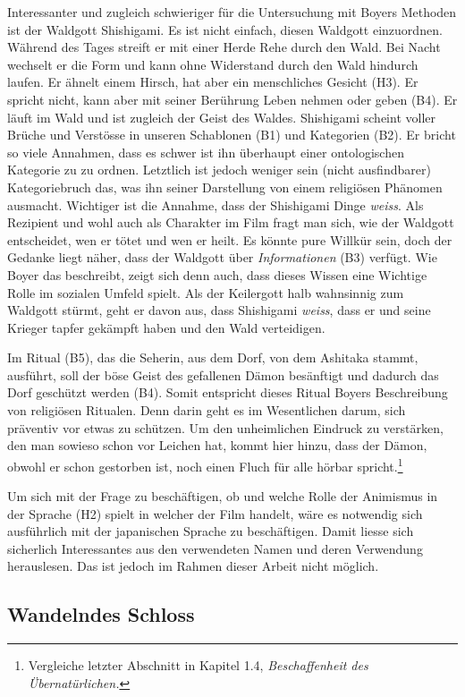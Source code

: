 Interessanter und zugleich schwieriger für die Untersuchung mit Boyers Methoden ist der Waldgott Shishigami. Es ist nicht einfach, diesen Waldgott einzuordnen. Während des Tages streift er mit einer Herde Rehe durch den Wald. Bei Nacht wechselt er die Form und kann ohne Widerstand durch den Wald hindurch laufen. Er ähnelt einem Hirsch, hat aber ein menschliches Gesicht (H3). Er spricht nicht, kann aber mit seiner Berührung Leben nehmen oder geben (B4). Er läuft im Wald und ist zugleich der Geist des Waldes. Shishigami scheint voller Brüche und Verstösse in unseren Schablonen (B1) und Kategorien (B2). Er bricht so viele Annahmen, dass es schwer ist ihn überhaupt einer ontologischen Kategorie zu zu ordnen. Letztlich ist jedoch weniger sein (nicht ausfindbarer) Kategoriebruch das, was ihn seiner Darstellung von einem religiösen Phänomen ausmacht. Wichtiger ist die Annahme, dass der Shishigami Dinge \emph{weiss}. Als Rezipient und wohl auch als Charakter im Film fragt man sich, wie der Waldgott entscheidet, wen er tötet und wen er heilt. Es könnte pure Willkür sein, doch der Gedanke liegt näher, dass der Waldgott über \emph{Informationen} (B3) verfügt. Wie Boyer das beschreibt, zeigt sich denn auch, dass dieses Wissen eine Wichtige Rolle im sozialen Umfeld spielt. Als der Keilergott halb wahnsinnig zum Waldgott stürmt, geht er davon aus, dass Shishigami \emph{weiss}, dass er und seine Krieger tapfer gekämpft haben und den Wald verteidigen. 

Im Ritual (B5), das die Seherin, aus dem Dorf, von dem Ashitaka stammt, ausführt, soll der böse Geist des gefallenen Dämon besänftigt und dadurch das Dorf geschützt werden (B4). Somit entspricht dieses Ritual Boyers Beschreibung von religiösen Ritualen. Denn darin geht es im Wesentlichen darum, sich präventiv vor etwas zu schützen. Um den unheimlichen Eindruck zu verstärken, den man sowieso schon vor Leichen hat, kommt hier hinzu, dass der Dämon, obwohl er schon gestorben ist, noch einen Fluch für alle hörbar spricht.\footnote{Vergleiche letzter Abschnitt in Kapitel 1.4, \emph{Beschaffenheit des Übernatürlichen.}}

Um sich mit der Frage zu beschäftigen, ob und welche Rolle der Animismus in der Sprache (H2) spielt in welcher der Film handelt, wäre es notwendig sich ausführlich mit der japanischen Sprache zu beschäftigen. Damit liesse sich sicherlich Interessantes aus den verwendeten Namen und deren Verwendung herauslesen. Das ist jedoch im Rahmen dieser Arbeit nicht möglich. 

\subsection{Wandelndes Schloss} 
